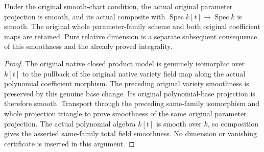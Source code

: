 \begin{theorem}
\label{thm:c0n-actual-original-family-smooth}
\leanok
{}
Under the original smooth-chart condition, the actual original parameter
projection is smooth, and its actual composite with $\operatorname{Spec}k[t]
\to\operatorname{Spec}k$ is smooth. The original whole parameter-family
scheme and both original coefficient maps are retained. Pure relative
dimension is a separate subsequent consequence of this smoothness and
the already proved integrality.
\end{theorem}
\begin{proof}
The original native closed product model is genuinely isomorphic over
$k[t]$ to the pullback of the original native variety field map along the
actual polynomial coefficient morphism. The preceding original variety
smoothness is preserved by this genuine base change. Its original
polynomial-base projection is therefore smooth. Transport through the
preceding same-family isomorphism and whole projection triangle to prove
smoothness of the same original parameter projection. The actual
polynomial algebra $k[t]$ is smooth over $k$, so composition gives the
asserted same-family total field smoothness. No dimension or vanishing
certificate is inserted in this argument.
\end{proof}
